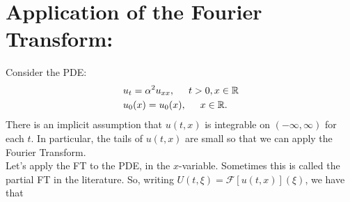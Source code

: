 \documentclass{book}
\theoremstyle{definition}
\newcommand{\R}{\mathbb{R}}
\newcommand{\F}{\mathcal{F}}
\newcommand{\ift}{\infty}
\begin{document}
\newpage





\chapter{Application of the Fourier Transform:}

Consider the PDE:
\begin{align*}
&u_t = \alpha^2 u_{xx}, \hspace{0.5cm} t>0, x\in \R\\
&u_0(x) = u_0(x), \hspace{0.5cm} x\in \R.
\end{align*}
There is an implicit assumption that $u(t,x)$ is integrable on $(-\ift, \ift)$ for each $t$. In particular, the tails of $u(t,x)$ are small so that we can apply the Fourier Transform.\\

Let's apply the FT to the PDE, in the $x$-variable. Sometimes this is called the partial FT in the literature. So, writing $U(t,\xi) = \F[u(t,x)](\xi)$, we have that
\end{document}

